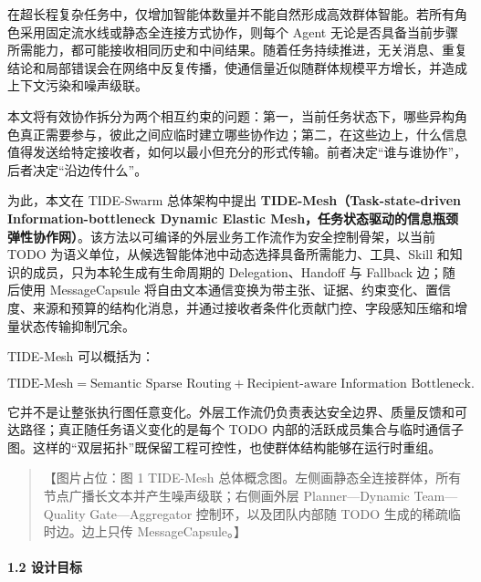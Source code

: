 \documentclass[UTF8,a4paper,12pt]{ctexart}
\begin{document}
在超长程复杂任务中，仅增加智能体数量并不能自然形成高效群体智能。若所有角色采用固定流水线或静态全连接方式协作，则每个 Agent 无论是否具备当前步骤所需能力，都可能接收相同历史和中间结果。随着任务持续推进，无关消息、重复结论和局部错误会在网络中反复传播，使通信量近似随群体规模平方增长，并造成上下文污染和噪声级联。

本文将有效协作拆分为两个相互约束的问题：第一，当前任务状态下，哪些异构角色真正需要参与，彼此之间应临时建立哪些协作边；第二，在这些边上，什么信息值得发送给特定接收者，如何以最小但充分的形式传输。前者决定``谁与谁协作''，后者决定``沿边传什么''。

为此，本文在 TIDE-Swarm 总体架构中提出 \textbf{TIDE-Mesh（Task-state-driven Information-bottleneck Dynamic Elastic Mesh，任务状态驱动的信息瓶颈弹性协作网）}。该方法以可编译的外层业务工作流作为安全控制骨架，以当前 TODO 为语义单位，从候选智能体池中动态选择具备所需能力、工具、Skill 和知识的成员，只为本轮生成有生命周期的 Delegation、Handoff 与 Fallback 边；随后使用 MessageCapsule 将自由文本通信变换为带主张、证据、约束变化、置信度、来源和预算的结构化消息，并通过接收者条件化贡献门控、字段感知压缩和增量状态传输抑制冗余。

TIDE-Mesh 可以概括为：

\[
\text{TIDE-Mesh}=\text{Semantic Sparse Routing}+\text{Recipient-aware Information Bottleneck}.
\]

它并不是让整张执行图任意变化。外层工作流仍负责表达安全边界、质量反馈和可达路径；真正随任务语义变化的是每个 TODO 内部的活跃成员集合与临时通信子图。这样的``双层拓扑''既保留工程可控性，也使群体结构能够在运行时重组。

\begin{quote}
【图片占位：图 1 TIDE-Mesh 总体概念图。左侧画静态全连接群体，所有节点广播长文本并产生噪声级联；右侧画外层 Planner—Dynamic Team—Quality Gate—Aggregator 控制环，以及团队内部随 TODO 生成的稀疏临时边。边上只传 MessageCapsule。】
\end{quote}

\paragraph{1.2 设计目标}
\end{document}
